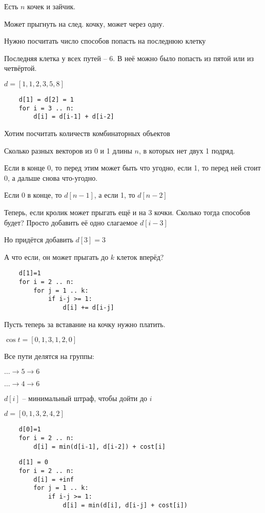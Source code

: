 \documentclass{book}
\theoremstyle{definition}
\begin{document}
\begin{problem}
    Есть $n$ кочек и зайчик. 

    Может прыгнуть на след. кочку, может через одну. 

    Нужно посчитать число способов попасть на последнюю клетку
\end{problem}

Последняя клетка у всех путей -- 6. В неё можно было попасть из пятой или из четвёртой. 

$d = [1, 1, 2, 3, 5, 8]$

 \begin{verbatim}
    d[1] = d[2] = 1
    for i = 3 .. n:
        d[i] = d[i-1] + d[i-2]
\end{verbatim}

Хотим посчитать количеств комбинаторных объектов

Сколько разных векторов из 0 и 1 длины $n$, в которых нет двух 1 подряд.

Если в конце 0, то перед этим может быть что угодно, если 1, то перед ней стоит 0, а дальше снова что-угодно.

Если 0 в конце, то $d[n-1]$, а если 1, то  $d[n-2]$

Теперь, если кролик может прыгать ещё и на 3 кочки. Сколько тогда способов будет? Просто добавить её одно слагаемое $d[i-3]$

Но придётся добавить  $d[3]=3$

А что если, он может прыгать до  $k$ клеток вперёд?

 \begin{verbatim}
    d[1]=1
    for i = 2 .. n:
        for j = 1 .. k:
            if i-j >= 1:
                d[i] += d[i-j]
\end{verbatim}  

Пусть теперь за вставание на кочку нужно платить.

$\cos t = [0,1,3, 1, 2, 0]$

Все пути делятся на группы:

$\ldots \to 5\to 6$

$\ldots\to 4\to 6$

$d[i]$ -- минимальный штраф, чтобы дойти до $i$

$d = [0,1,3,2,4,2] $

\begin{verbatim}
    d[0]=1
    for i = 2 .. n:
        d[i] = min(d[i-1], d[i-2]) + cost[i]
\end{verbatim}

\begin{verbatim}
    d[1] = 0
    for i = 2 .. n:
        d[i] = +inf
        for j = 1 .. k:
            if i-j >= 1:
                d[i] = min(d[i], d[i-j] + cost[i])
\end{verbatim}
\end{document}
